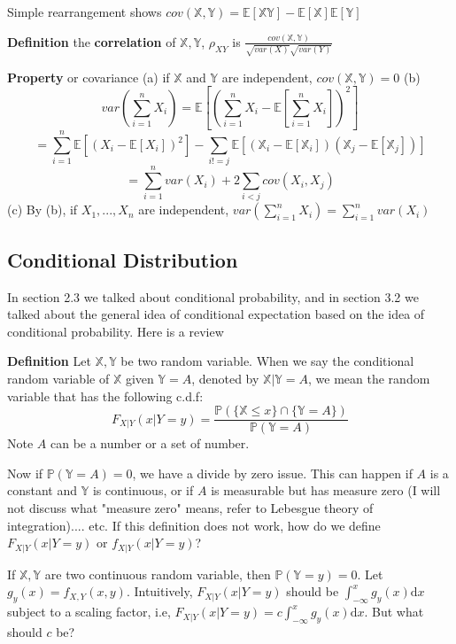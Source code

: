 \documentclass[a4paper,12pt]{article}
\begin{document}
Simple rearrangement shows $cov( \mathbb{X}, \mathbb{Y} ) = \mathbb{E}[\mathbb{X}\mathbb{Y}] - \mathbb{E}[\mathbb{X}]\mathbb{E}[\mathbb{Y}]$

\textbf{Definition} the \textbf{correlation} of $\mathbb{X}, \mathbb{Y}$, $\rho_{XY}$ is
$\frac{cov( \mathbb{X}, \mathbb{Y} )}{\sqrt{var(X)}\sqrt{var(Y)}}$

\textbf{Property} or covariance 
(a) if $\mathbb{X}$ and $\mathbb{Y}$ are independent, $cov( \mathbb{X}, \mathbb{Y} ) = 0$ 
(b) $$var(\sum_{i=1}^n X_i) = \mathbb{E}[(\sum_{i=1}^n X_i - \mathbb{E}[\sum_{i=1}^n X_i])^2]$$
$$= \sum_{i=1}^n \mathbb{E}[ (X_i - \mathbb{E}[X_i])^2 ] - \sum_{i!=j}\mathbb{E}[ (\mathbb{X}_i - \mathbb{E}[\mathbb{X}_i])(\mathbb{X}_j - \mathbb{E}[\mathbb{X}_j]) ]$$
$$= \sum_{i=1}^n var(X_i) + 2 \sum_{i<j}cov(X_i, X_j)$$
(c) By (b), if $X_1, ..., X_n$ are independent, $var(\sum_{i=1}^n X_i) = \sum_{i=1}^n var(X_i)$ 

\subsection{Conditional Distribution}
In section 2.3 we talked about conditional probability, and in section 3.2 we talked about the general idea of conditional expectation based on the idea of conditional probability. Here is a review

\textbf{Definition} Let $\mathbb{X}, \mathbb{Y}$ be two random variable. When we say the conditional random variable of $\mathbb{X}$ given $\mathbb{Y} = A$, denoted by $\mathbb{X}|{\mathbb{Y}=A} $, we mean the random variable that has the following c.d.f:
$$F_{X|Y}(x|Y=y) = \frac{\mathbb{P}( \{\mathbb{X} \leq x\} \cap \{\mathbb{Y} = A\} )}{\mathbb{P}(\mathbb{Y} = A)} $$
Note $A$ can be a number or a set of number.

Now if  $\mathbb{P}(\mathbb{Y} = A) = 0$, we have a divide by zero issue. This can happen if $A$ is a constant and $\mathbb{Y}$ is continuous, or if $A$ is measurable but has measure zero (I will not discuss what "measure zero" means, refer to Lebesgue theory of integration).... etc. If this definition does not work, how do we define $F_{X|Y}(x|Y=y)$ or $f_{X|Y}(x|Y=y)$? 

If $\mathbb{X}, \mathbb{Y}$ are two continuous random variable, then $\mathbb{P}(\mathbb{Y} = y) = 0$. Let $g_y(x) = f_{X, Y}(x, y)$. Intuitively, $F_{X|Y}(x|Y=y)$ should be $\int_{-\infty}^x g_y(x) \mathrm{d}x$ subject to a scaling factor, i.e, $F_{X|Y}(x|Y=y) = c\int_{-\infty}^x g_y(x) \mathrm{d}x$. But what should $c$ be?
\end{document}
